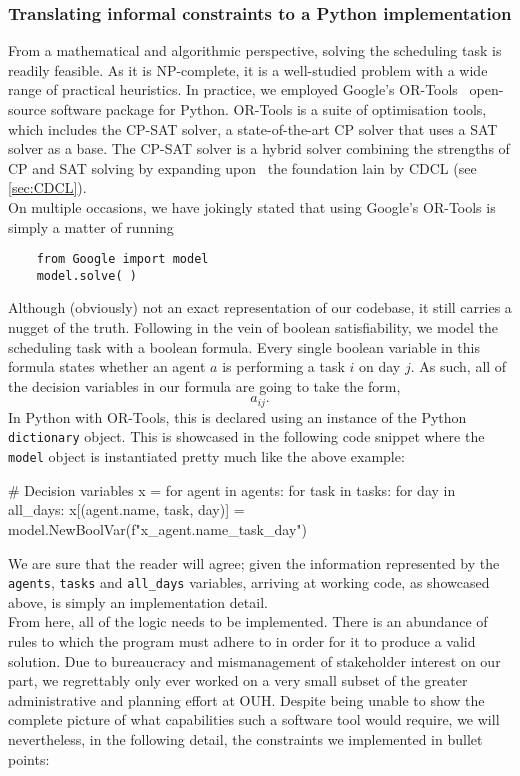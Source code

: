 \subsubsection*{Translating informal constraints to a Python implementation}
From a mathematical and algorithmic perspective, solving the scheduling task is readily feasible. As it is NP-complete, it is a well-studied problem with a wide range of practical heuristics. In practice, we employed Google's OR-Tools~\cite{Wiki-OR-Tools} open-source software package for Python. OR-Tools is a suite of optimisation tools, which includes the CP-SAT solver, a state-of-the-art CP solver that uses a SAT solver as a base. The CP-SAT solver is a hybrid solver combining the strengths of CP and SAT solving by expanding upon~\cite{Lazy-Clause-Generation} the foundation lain by CDCL (see \autoref{sec:CDCL}).
\\
On multiple occasions, we have jokingly stated that using Google's OR-Tools is simply a matter of running
\begin{verbatim}
    from Google import model
    model.solve( )
\end{verbatim}
Although (obviously) not an exact representation of our codebase, it still carries a nugget of the truth. Following in the vein of boolean satisfiability, we model the scheduling task with a boolean formula. Every single boolean variable in this formula states whether an agent \(a\) is performing a task \(i\) on day \(j\). As such, all of the decision variables in our formula are going to take the form,
\begin{equation}\label{eq:decision-variable-form}
	a_{ij}.
\end{equation}
In Python with OR-Tools, this is declared using an instance of the Python \texttt{dictionary} object. This is showcased in the following code snippet where the \texttt{model} object is instantiated pretty much like the above example:
\begin{python}
# Decision variables
x = {}
for agent in agents:
    for task in tasks:
        for day in all_days:
            x[(agent.name, task, day)] = model.NewBoolVar(f"x_{agent.name}_{task}_{day}")
\end{python}
We are sure that the reader will agree; given the information represented by the \texttt{agents}, \texttt{tasks} and \texttt{all_days} variables, arriving at working code, as showcased above, is simply an implementation detail.
\\
From here, all of the logic needs to be implemented. There is an abundance of rules to which the program must adhere to in order for it to produce a valid solution. Due to bureaucracy and mismanagement of stakeholder interest on our part, we regrettably only ever worked on a very small subset of the greater administrative and planning effort at OUH. Despite being unable to show the complete picture of what capabilities such a software tool would require, we will nevertheless, in the following detail, the constraints we implemented in bullet points:
